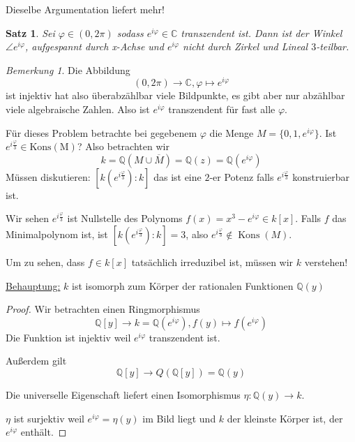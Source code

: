 \documentclass[a4paper,12pt,numbers=noenddot,parskip=full]{scrartcl}
\newcommand{\setQ}{\mathbb{Q}}
\newcommand{\setC}{\mathbb{C}}
\newcommand{\heading}{\underline}
\theoremstyle{dotless}
\newtheorem{theorem}{Satz}[section]
\theoremstyle{remark}
\newtheorem*{remark}{Bemerkung}
\begin{document}
	Dieselbe Argumentation liefert mehr!
	
	\begin{theorem}
		Sei $\varphi \in (0,2\pi)$ sodass $e^{i \varphi} \in \setC$ transzendent ist. Dann ist der Winkel $\angle e^{i\varphi}$, aufgespannt durch x-Achse und $e^{i\varphi}$ nicht durch Zirkel und Lineal $3$-teilbar.
	\end{theorem}

	\begin{remark}
		Die Abbildung
		\begin{equation*}
			(0, 2\pi) \to \setC, \varphi \mapsto e^{i \varphi}
		\end{equation*}
		ist injektiv hat also überabzählbar viele Bildpunkte, es gibt aber nur abzählbar viele algebraische Zahlen. Also ist $e^{i \varphi}$ transzendent für fast alle $\varphi$.
	\end{remark}

	Für dieses Problem betrachte bei gegebenem $\varphi$ die Menge $M = \{ 0, 1, e^{i \varphi} \}$. Ist $e^{i \frac{\varphi}{3}} \in \operatorname{Kons(M)}$? Also betrachten wir
	\begin{equation*}
		k = \setQ(M \cup \overline{M}) = \setQ(z) = \setQ(e^{i \varphi})
	\end{equation*}
	Müssen diskutieren: $[k(e^{i \frac{\varphi}{3}}): k]$ das ist eine $2$-er Potenz falls $e^{i \frac{\varphi}{3}}$ konstruierbar ist.
	
	Wir sehen $e^{i \frac{\varphi}{3}}$ ist Nullstelle des Polynoms $f(x) = x^3 - e^{i \varphi} \in k[x]$. Falls $f$ das Minimalpolynom ist, ist $[k(e^{i \frac{\varphi}{3}}): k] = 3$, also $e^{i \frac{\varphi}{3}} \notin \operatorname{Kons}(M)$.
	
	Um zu sehen, dass $f \in k[x]$ tatsächlich irreduzibel ist, müssen wir $k$ verstehen!
	
	\heading{Behauptung:} $k$ ist isomorph zum Körper der rationalen Funktionen $\setQ(y)$
	
	\begin{proof}
		Wir betrachten einen Ringmorphismus
		\begin{equation*}
			\setQ[y] \to k = \setQ(e^{i \varphi}), f(y) \mapsto f(e^{i \varphi})
		\end{equation*}
		Die Funktion ist injektiv weil $e^{i \varphi}$ transzendent ist.
		
		Außerdem gilt
		\begin{equation*}
			\setQ[y] \to Q(\setQ[y]) = \setQ(y)
		\end{equation*}
		
		Die universelle Eigenschaft liefert einen Isomorphismus $\eta: \setQ(y) \to k$.
		
		$\eta$ ist surjektiv weil $e^{i \varphi} = \eta(y)$ im Bild liegt und $k$ der kleinste Körper ist, der $e^{i \varphi}$ enthält.
	\end{proof}
\end{document}
